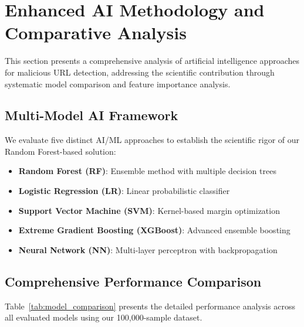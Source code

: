 
\section{Enhanced AI Methodology and Comparative Analysis}\label{sec:ai_methodology}

This section presents a comprehensive analysis of artificial intelligence approaches for malicious URL detection, addressing the scientific contribution through systematic model comparison and feature importance analysis.

\subsection{Multi-Model AI Framework}

We evaluate five distinct AI/ML approaches to establish the scientific rigor of our Random Forest-based solution:

\begin{itemize}
\item \textbf{Random Forest (RF)}: Ensemble method with multiple decision trees
\item \textbf{Logistic Regression (LR)}: Linear probabilistic classifier
\item \textbf{Support Vector Machine (SVM)}: Kernel-based margin optimization
\item \textbf{Extreme Gradient Boosting (XGBoost)}: Advanced ensemble boosting
\item \textbf{Neural Network (NN)}: Multi-layer perceptron with backpropagation
\end{itemize}

\subsection{Comprehensive Performance Comparison}

Table~\ref{tab:model_comparison} presents the detailed performance analysis across all evaluated models using our 100,000-sample dataset.

